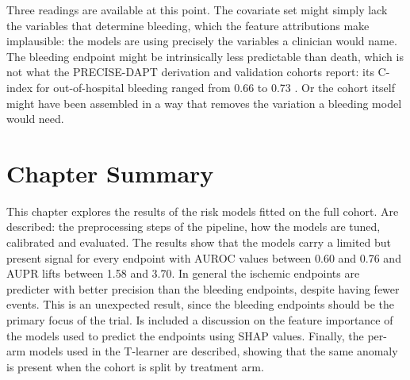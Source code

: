 Three readings are available at this point. The covariate set might simply
lack the variables that determine bleeding, which the feature attributions
make implausible: the models are using precisely the variables a clinician
would name. The bleeding endpoint might be intrinsically less predictable than
death, which is not what the PRECISE-DAPT derivation and validation cohorts
report: its C-index for out-of-hospital bleeding ranged from 0.66 to 0.73
\citep{costa2017precisedapt}. Or the cohort itself might have been assembled in
a way that removes the variation a bleeding model would need.

\section{Chapter Summary}
This chapter explores the results of the risk models fitted on the full cohort.
Are described: the preprocessing steps of the pipeline, how the models are tuned,
calibrated and evaluated.
The results show that the models carry a limited but present signal for every endpoint
with AUROC values between 0.60 and 0.76 and AUPR lifts between 1.58 and 3.70.
In general the ischemic endpoints are predicter with better precision than 
the bleeding endpoints, despite having fewer events.
This is an unexpected result, since the bleeding endpoints should be the primary focus of the trial.
Is included a discussion on the feature importance of the models used to predict the endpoints using SHAP values.
Finally, the per-arm models used in the T-learner are described, 
showing that the same anomaly is present when the cohort is split by treatment arm.